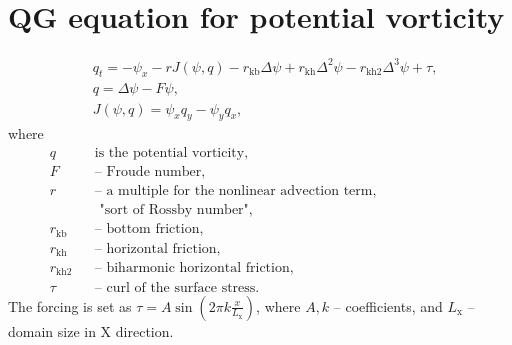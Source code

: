 \documentclass[intlimits,fleqn, 12pt]{article}
\begin{document}
\thispagestyle{empty}
\section*{QG equation for potential vorticity}
\begin{align*}
  &q_t = - \psi_x - r J(\psi, q) - r_\mathrm{kb} \Delta \psi + r_\mathrm{kh} \Delta^2 \psi - r_\mathrm{kh2} \Delta^3 \psi + \tau,\\
  &q = \Delta \psi - F \psi,\\
  &J(\psi, q) = \psi_x q_y - \psi_y q_x,
\end{align*}
where
\begin{align*}
  &q & &\text{is the potential vorticity}, \hspace{7cm}\\
  &F & &\text{-- Froude number},\\
  &r & &\text{-- a multiple for the nonlinear advection term,}\\
  &&& \text{\ \ "sort of Rossby number"},\\
  &r_\mathrm{kb} & &\text{-- bottom friction},\\
  &r_\mathrm{kh} & &\text{-- horizontal friction},\\
  &r_\mathrm{kh2} & &\text{-- biharmonic horizontal friction},\\
  &\tau & & \text{-- curl of the surface stress}.
\end{align*}
The forcing is set as $\tau = A \sin(2\pi k \frac{x}{L_\mathrm{x}})$, where $A,k$ -- coefficients, and $L_\mathrm{x}$ -- domain size in X direction.
\end{document}
